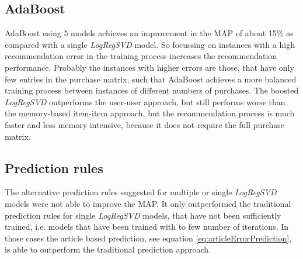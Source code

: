 \documentclass[10pt]{reportMaster}
\begin{document}
\subsection{AdaBoost}
\label{sec:discAdaBoost}
AdaBoost using 5 models achieves an improvement in the MAP of about 15\% as compared with a single \textit{LogRegSVD} model.
So focussing on instances with a high recommendation error in the training process increases the recommendation performance.
Probably the instances with higher errors are those, that have only few entries in the purchase matrix, such that AdaBoost achieves a more balanced training process between instances of different numbers of purchases.
The boosted \textit{LogRegSVD} outperforms the user-user approach, but still performs worse than the memory-based item-item approach, but the recommendation process is much faster and less memory intensive, because it does not require the full purchase matrix.

\subsection{Prediction rules}
\label{sec:discPredRules}
The alternative prediction rules suggested for multiple or single \textit{LogRegSVD} models were not able to improve the MAP.
It only outperformed the traditional prediction rules for single \textit{LogRegSVD} models, that have not been sufficiently trained, i.e. models that have been trained with to few number of iterations.
In those cases the article based prediction, see equation \ref{eq:articleErrorPrediction}, is able to outperform the traditional prediction approach.
\end{document}
